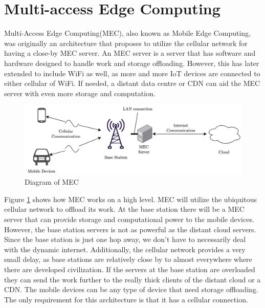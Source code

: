 




\section{Multi-access Edge Computing}
Multi-Access Edge Computing(MEC), also known as Mobile Edge Computing, was originally an architecture that proposes to utilize the cellular network for having a close-by MEC server\cite{porambage_survey_2018}. An MEC server is a server that has software and hardware designed to handle work and storage offloading. However, this has later extended to include WiFi as well, as more and more IoT devices are connected to either cellular of WiFi. If needed, a distant data centre or CDN can aid the MEC server with even more storage and computation.
\begin{figure}[t]
    \centering
    \includegraphics[scale=0.75]{chapters/architectures/figures/MEC.png}
    \caption{Diagram of MEC}
    \label{fig:MEC}
\end{figure}

Figure \ref{fig:MEC} shows how MEC works on a high level. MEC will utilize the ubiquitous cellular network to offload its work. At the base station there will be a MEC server that can provide storage and computational power to the mobile devices. However, the base station servers is not as powerful as the distant cloud servers. Since the base station is just one hop away, we don't have to necessarily deal with the dynamic internet. Additionally, the cellular network provides a very small delay, as base stations are relatively close by to almost everywhere where there are developed civilization. If the servers at the base station are overloaded they can send the work further to the really thick clients of the distant cloud or a CDN. The mobile devices can be any type of device that need storage offloading. The only requirement for this architecture is that it has a cellular connection.

